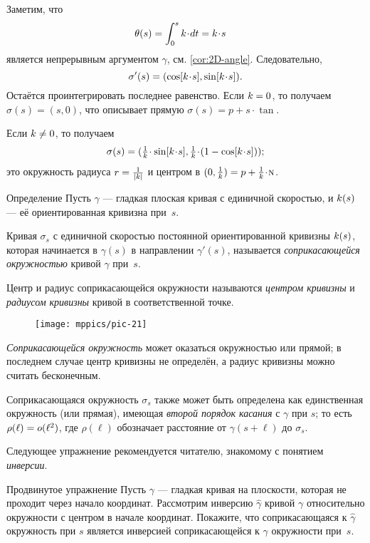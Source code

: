 Заметим, что
\begin{align*}\theta(s)&=\int_{0}^s\skur\cdot dt=\skur\cdot s
\end{align*}
является непрерывным аргументом $\gamma$, см. \ref{cor:2D-angle}.
Следовательно,
\[\sigma'(s)=(\cos[\skur\cdot s],\sin[\skur\cdot s]).\]
Остаётся проинтегрировать последнее равенство.
Если $k=0$, то получаем $\sigma(s)=(s,0)$,
что описывает прямую $\sigma(s)=p+s\cdot \tan$.

Если $k\ne 0$, то получаем
\[\sigma(s)=(\tfrac1\skur\cdot\sin[\skur\cdot s], \tfrac1\skur\cdot(1-\cos[\skur\cdot s]));\]
это окружность радиуса $r=\tfrac1{|k|}$ и центром в $(0,\tfrac1\skur)=p+\tfrac1\skur\cdot\norm$.
\qeds

\begin{thm}{Определение}
Пусть $\gamma$ --- гладкая плоская кривая с единичной скоростью,
и $k(s)$ --- её ориентированная кривизна при~$s$.

Кривая $\sigma_s$ с единичной скоростью постоянной ориентированной кривизны $k(s)$, которая начинается в $\gamma(s)$ в направлении $\gamma'(s)$, называется \emph{соприкасающейся окружностью} кривой $\gamma$ при~$s$.

Центр и радиус соприкасающейся окружности называются \emph{центром кривизны} и \emph{радиусом кривизны} кривой в соответственной точке.
\end{thm}

{

\begin{wrapfigure}{o}{31 mm}
\vskip-0mm
\centering
\texttt{[image: mppics/pic-21]}
\vskip0mm
\end{wrapfigure}

\textit{Соприкасающейся окружность} может оказаться окружностью или прямой;
в последнем случае центр кривизны не определён, а радиус кривизны можно считать бесконечным.  

Соприкасающаяся окружность $\sigma_s$ также может быть определена как единственная окружность (или прямая), имеющая \emph{второй порядок касания} с $\gamma$ при $s$;
то есть $\rho(\ell)\z=o(\ell^2)$, где $\rho(\ell)$ обозначает расстояние от $\gamma(s+\ell)$ до $\sigma_s$.

Следующее упражнение рекомендуется читателю, знакомому с понятием \emph{инверсии}.

}

\begin{thm}{Продвинутое упражнение}\label{ex:inverse}
Пусть $\gamma$ --- гладкая кривая на плоскости, которая не проходит через начало координат.
Рассмотрим инверсию $\hat \gamma$ кривой $\gamma$ относительно окружности с центром в начале координат.
Покажите, что соприкасающаяся к $\hat\gamma$ окружность при $s$ является инверсией соприкасающейся к $\gamma$ окружности  при~$s$.
\end{thm}

